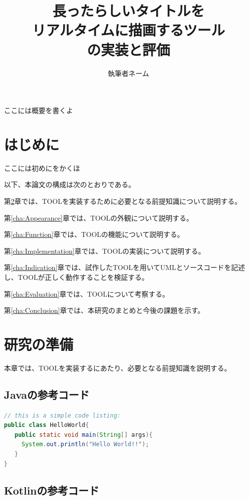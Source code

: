 \documentclass[uplatex, report, a4j, 10pt, dvipdfmx]{jsbook}
\title{長ったらしいタイトルを \\ リアルタイムに描画するツール \\ \tool{}の実装と評価}
\author{執筆者ネーム}
\newcommand{\tool}{TOOL}
\begin{document}
\maketitle


ここには概要を書くよ


%
\chapter{はじめに}\label{cha:Introduction}

ここには初めにをかくほ

以下、本論文の構成は次のとおりである。

第\ref{cha:Preparation}章では、\tool{}を実装するために必要となる前提知識について説明する。

第\ref{cha:Appearance}章では、\tool{}の外観について説明する。

第\ref{cha:Function}章では、\tool{}の機能について説明する。

第\ref{cha:Implementation}章では、\tool{}の実装について説明する。

第\ref{cha:Indication}章では、試作した\tool{}を用いてUMLとソースコードを記述し、\tool{}が正しく動作することを検証する。

第\ref{cha:Evaluation}章では、\tool{}について考察する。

第\ref{cha:Conclusion}章では、本研究のまとめと今後の課題を示す。



\chapter{研究の準備}\label{cha:Preparation}

本章では、\tool{}を実装するにあたり、必要となる前提知識を説明する。
\section{Javaの参考コード}

\begin{lstlisting}[caption={Javaの参考コード}, label={lst:example_java}, language=Java]
// this is a simple code listing:
public class HelloWorld{
   public static void main(String[] args){
     System.out.println("Hello World!!");
   }
}
\end{lstlisting}

\section{Kotlinの参考コード}
\end{document}
